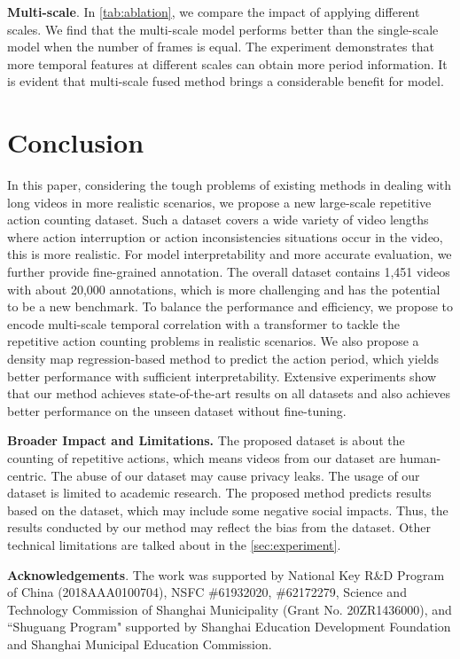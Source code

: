 \documentclass[10pt,twocolumn,letterpaper]{article}
\begin{document}
\noindent \textbf{Multi-scale}. In \cref{tab:ablation}, we compare the impact of applying different scales. We find that the multi-scale model performs better than the single-scale model when the number of frames is equal. The experiment demonstrates that more temporal features at different scales can obtain more period information. It is evident that multi-scale fused method brings a considerable benefit for model. 

\section{Conclusion}

In this paper, considering the tough problems of existing methods in dealing with long videos in more realistic scenarios, we propose a new large-scale repetitive action counting dataset. Such a dataset covers a wide variety of video lengths where action interruption or action inconsistencies situations occur in the video, this is more realistic. For model interpretability and more accurate evaluation, we further provide fine-grained annotation. The overall dataset contains 1,451 videos with about 20,000 annotations, which is more challenging and has the potential to be a new benchmark.
To balance the performance and efficiency, we propose to encode multi-scale temporal correlation with a transformer to tackle the repetitive action counting problems in realistic scenarios. We also propose a density map regression-based method to predict the action period, which yields better performance with sufficient interpretability. Extensive experiments show that our method achieves state-of-the-art results on all datasets and also achieves better performance on the unseen dataset without fine-tuning.

\noindent \textbf{Broader Impact and Limitations.} The proposed dataset is about the counting of repetitive actions, which means videos from our dataset are human-centric. The abuse of our dataset may cause privacy leaks. The usage of our dataset is limited to academic research. The proposed method predicts results based on the dataset, which may include some negative social impacts. Thus, the results conducted by our method may reflect the bias from the dataset. Other technical limitations are talked about in the \cref{sec:experiment}.

\noindent \textbf{Acknowledgements}. 
The work was supported by National Key R\&D Program of China (2018AAA0100704), NSFC \#61932020, \#62172279,  Science and Technology Commission of Shanghai Municipality (Grant No. 20ZR1436000), and “Shuguang Program" supported by Shanghai Education Development Foundation and Shanghai Municipal Education Commission. 
\end{document}
